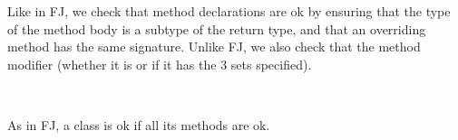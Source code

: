 \documentclass[a4paper]{article}
\begin{document}
Like in FJ, we check that method declarations are ok by ensuring that the type of the method body is a subtype
    of the return type, and that an overriding method has the same signature.
Unlike FJ, we also check that the method modifier (whether it is \hescaping or if it has the 3 sets specified).


\beqst %
~
\eeq
\beqst %
~
\eeq


As in FJ, a class is ok if all its methods  are ok.


\end{document}
